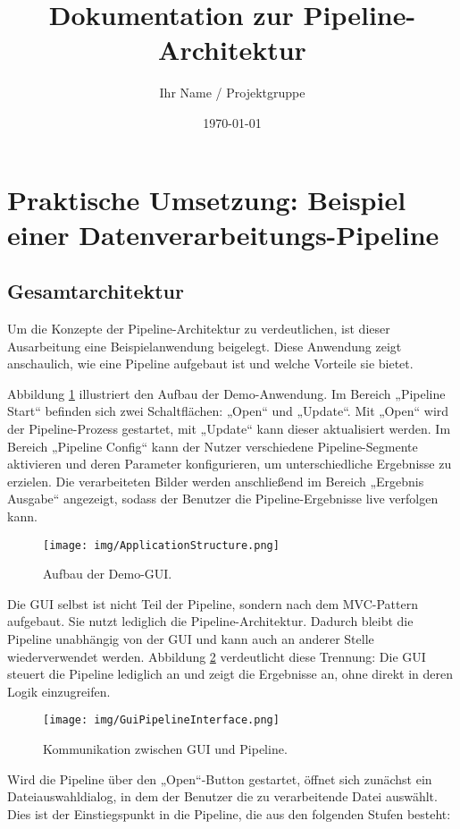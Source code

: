 \documentclass[a4paper]{article} %
\title{Dokumentation zur Pipeline-Architektur}
\author{Ihr Name / Projektgruppe}
\date{\today}
\begin{document}
\section{Praktische Umsetzung: Beispiel einer Datenverarbeitungs-Pipeline}
\subsection{Gesamtarchitektur}
Um die Konzepte der Pipeline-Architektur zu verdeutlichen, ist dieser Ausarbeitung eine Beispielanwendung beigelegt. Diese Anwendung zeigt anschaulich, wie eine Pipeline aufgebaut ist und welche Vorteile sie bietet.

Abbildung \ref{fig:application_structure} illustriert den Aufbau der Demo-Anwendung. Im Bereich „Pipeline Start“ befinden sich zwei Schaltflächen: „Open“ und „Update“. Mit „Open“ wird der Pipeline-Prozess gestartet, mit „Update“ kann dieser aktualisiert werden. Im Bereich „Pipeline Config“ kann der Nutzer verschiedene Pipeline-Segmente aktivieren und deren Parameter konfigurieren, um unterschiedliche Ergebnisse zu erzielen. Die verarbeiteten Bilder werden anschließend im Bereich „Ergebnis Ausgabe“ angezeigt, sodass der Benutzer die Pipeline-Ergebnisse live verfolgen kann.

\begin{figure}[htbp]
    \centering
    \texttt{[image: img/ApplicationStructure.png]}
    \caption{Aufbau der Demo-GUI.}
    \label{fig:application_structure}
\end{figure}

\begin{samepage}
Die GUI selbst ist nicht Teil der Pipeline, sondern nach dem MVC-Pattern aufgebaut. Sie nutzt lediglich die Pipeline-Architektur. Dadurch bleibt die Pipeline unabhängig von der GUI und kann auch an anderer Stelle wiederverwendet werden. Abbildung \ref{fig:gui_pipeline_interface} verdeutlicht diese Trennung: Die GUI steuert die Pipeline lediglich an und zeigt die Ergebnisse an, ohne direkt in deren Logik einzugreifen.

\begin{figure}[htbp]
    \centering
    \texttt{[image: img/GuiPipelineInterface.png]}
    \caption{Kommunikation zwischen GUI und Pipeline.}
    \label{fig:gui_pipeline_interface}
\end{figure}
\end{samepage}

Wird die Pipeline über den „Open“-Button gestartet, öffnet sich zunächst ein Dateiauswahldialog, in dem der Benutzer die zu verarbeitende Datei auswählt. Dies ist der Einstiegspunkt in die Pipeline, die aus den folgenden Stufen besteht:
\end{document}
